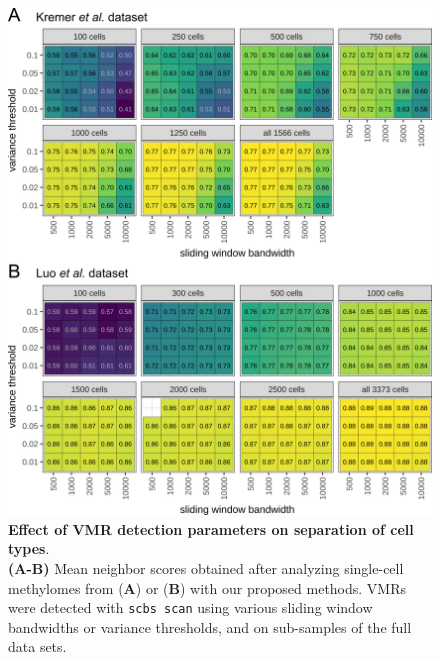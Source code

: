 \documentclass[twocolumn,10pt]{article}
\begin{document}
\begin{figure}
    \begin{center}
        \includegraphics[width=.6\textwidth]{figures/SFig_parameter_sweep.png}
    \end{center}
    \caption{\small \textbf{Effect of VMR detection parameters on separation of cell types}.\\
    \textbf{(A-B)} Mean neighbor scores obtained after analyzing single-cell methylomes from \citet{kremer_scnmt} (\textbf{A}) or \citet{luo2017single} (\textbf{B}) with our proposed methods.
    VMRs were detected with \texttt{scbs scan} using various sliding window bandwidths or variance thresholds, and on sub-samples of the full data sets.
    }
    \label{fig:sweep}
\end{figure}
\end{document}
